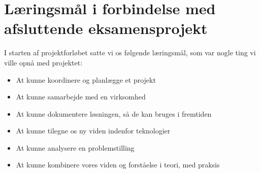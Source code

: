\section{Læringsmål i forbindelse med afsluttende eksamensprojekt}
I starten af projektforløbet satte vi os følgende læringsmål, som var nogle ting vi ville opnå med projektet:
\begin{itemize}
    \item{At kunne koordinere og planlægge et projekt}
    \item{At kunne samarbejde med en virksomhed}
    \item{At kunne dokumentere løsningen, så de kan bruges i fremtiden}
    \item{At kunne tilegne os ny viden indenfor teknologier}
    \item{At kunne analysere en problemstilling}
    \item{At kunne kombinere vores viden og forståelse i teori, med praksis}
\end{itemize}
